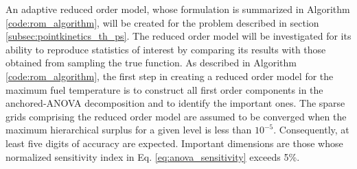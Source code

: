 An adaptive reduced order model, whose formulation is summarized in Algorithm \ref{code:rom_algorithm}, will be created for the problem described in section \ref{subsec:pointkinetics_th_ps}. The reduced order model will be investigated for its ability to reproduce statistics of interest by comparing its results with those obtained from sampling the true function. As described in Algorithm \ref{code:rom_algorithm}, the first step in creating a reduced order model for the maximum fuel temperature is to construct all first order components in the anchored-\ac{ANOVA} decomposition and to identify the important ones. The sparse grids comprising the reduced order model are assumed to be converged when the maximum hierarchical surplus for a given level is less than $10^{-5}$. Consequently, at least five digits of accuracy are expected. Important dimensions are those whose normalized sensitivity index in Eq. \ref{eq:anova_sensitivity} exceeds 5\%.

